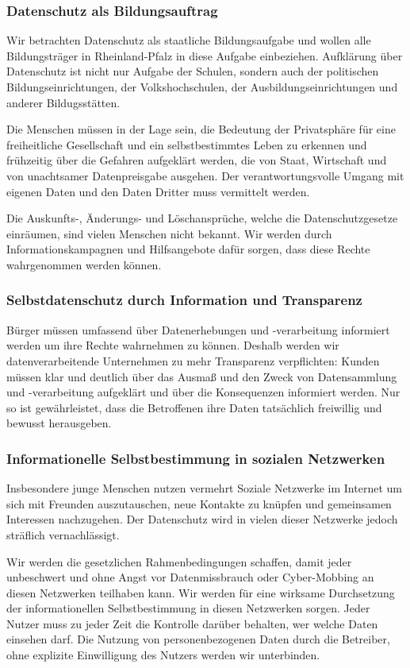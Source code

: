 \subsubsection{Datenschutz als Bildungsauftrag}
\abstimmung
Wir betrachten Datenschutz als staatliche Bildungsaufgabe und wollen alle Bildungsträger in Rheinland-Pfalz in diese Aufgabe einbeziehen. Aufklärung über Datenschutz ist nicht nur Aufgabe der Schulen, sondern auch der politischen Bildungseinrichtungen, der Volkshochschulen, der Ausbildungseinrichtungen und anderer Bildugsstätten.

Die Menschen müssen in der Lage sein, die Bedeutung der Privatsphäre für eine freiheitliche Gesellschaft und ein selbstbestimmtes Leben zu erkennen und frühzeitig über die Gefahren aufgeklärt werden, die von Staat, Wirtschaft und von unachtsamer Datenpreisgabe ausgehen. Der verantwortungsvolle Umgang mit eigenen Daten und den Daten Dritter muss vermittelt werden.

Die Auskunfts-, Änderungs- und Löschansprüche, welche die Datenschutzgesetze einräumen, sind vielen Menschen nicht bekannt. Wir werden durch Informationskampagnen und Hilfsangebote dafür sorgen, dass diese Rechte wahrgenommen werden können.

\subsubsection{Selbstdatenschutz durch Information und Transparenz}
\abstimmung
Bürger müssen umfassend über Datenerhebungen und -verarbeitung informiert werden um ihre Rechte wahrnehmen zu können. Deshalb werden wir datenverarbeitende Unternehmen zu mehr Transparenz verpflichten: Kunden müssen klar und deutlich über das Ausmaß und den Zweck von Datensammlung und -verarbeitung aufgeklärt und über die Konsequenzen informiert werden. Nur so ist gewährleistet, dass die Betroffenen ihre Daten tatsächlich freiwillig und bewusst herausgeben.

\subsubsection{Informationelle Selbstbestimmung in sozialen Netzwerken}
\abstimmung
Insbesondere junge Menschen nutzen vermehrt Soziale Netzwerke im Internet um sich mit Freunden auszutauschen, neue Kontakte zu knüpfen und gemeinsamen Interessen nachzugehen. Der Datenschutz wird in vielen dieser Netzwerke jedoch sträflich vernachlässigt.

Wir werden die gesetzlichen Rahmenbedingungen schaffen, damit jeder unbeschwert und ohne Angst vor Datenmissbrauch oder Cyber-Mobbing an diesen Netzwerken teilhaben kann. Wir werden für eine wirksame Durchsetzung der informationellen Selbstbestimmung in diesen Netzwerken sorgen. Jeder Nutzer muss zu jeder Zeit die Kontrolle darüber behalten, wer welche Daten einsehen darf. Die Nutzung von personenbezogenen Daten durch die Betreiber, ohne explizite Einwilligung des Nutzers werden wir unterbinden.

